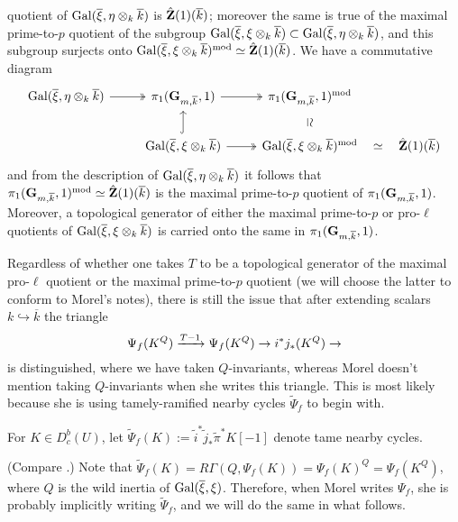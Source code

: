 \documentclass[deligne.tex]{subfiles}
\begin{document}
quotient of $\operatorname{Gal}(\overline\xi,\eta\otimes_k\overline k)$ is
$\hat{\mathbf{Z}}(1)(\overline k)$; moreover the same is true of the maximal
prime-to-$p$ quotient of the subgroup
$\operatorname{Gal}(\overline\xi,\xi\otimes_k\overline k)\subset\operatorname{Gal}(\overline\xi,\eta\otimes_k\overline k)$, and this subgroup surjects onto
$\operatorname{Gal}(\overline\xi,\xi\otimes_k\overline k)^{\text{mod}}\simeq\hat{\mathbf{Z}}(1)(\overline k)$. We have a commutative diagram \cite[2.2.2]{Laumon}
\begin{equation*}\begin{tikzcd}
	\Gal(\overline\xi,\eta\otimes_k\overline k)\arrow[r,twoheadrightarrow]
	&\pi_1(\GG_{m,\overline k},1)\arrow[r,twoheadrightarrow]
	&\pi_1(\GG_{m,\overline k},1)^{\text{mod}}
	\\
	&\Gal(\overline\xi,\xi\otimes_k\overline k)
	\arrow[u,hook]
	\arrow[r,twoheadrightarrow]
	&\Gal(\overline\xi,\xi\otimes_k\overline k)^{\text{mod}}
	\arrow[u, phantom,"\text{\rotatebox{-90}{$\simeq$}}"]\arrow[r,phantom,"\simeq"]
	&\hat\ZZ(1)(\overline k)
\end{tikzcd}\end{equation*}
and from the description of $\operatorname{Gal}(\overline\xi,\eta\otimes_k\overline k)$
it follows that
$\pi_1(\mathbf{G}_{m,\overline k},1)^{\text{mod}}\simeq\hat{\mathbf{Z}}(1)(\overline k)$ is
the maximal prime-to-$p$ quotient of $\pi_1(\mathbf{G}_{m,\overline k},1)$.
Moreover, a topological generator of either the maximal prime-to-$p$ or
pro-$\ell$ quotients of $\operatorname{Gal}(\overline\xi,\xi\otimes_k\overline k)$
is carried onto the same in $\pi_1(\mathbf{G}_{m,\overline k},1)$.

Regardless of whether one takes $T$ to be a topological generator of the
maximal pro-$\ell$ quotient or the maximal prime-to-$p$ quotient (we will
choose the latter to conform to Morel's notes), there is still the issue 
that after extending scalars $k\hookrightarrow\overline k$ the triangle
\begin{equation*}
	\Psi_f(K^Q)\xrightarrow{T-1}\Psi_f(K^Q)\rightarrow i^*j_*(K^Q)\rightarrow
\end{equation*}
is distinguished, where we have taken $Q$-invariants, whereas Morel doesn't
mention taking $Q$-invariants when she writes this triangle.
This is most likely because she is using tamely-ramified nearby cycles
$\tilde\Psi_f$ to begin with.
\begin{definition*}
	For $K\in D_c^b(U)$, let
	$\tilde\Psi_f(K):=\tilde i^*\tilde j_*\tilde\pi^*K[-1]$ denote tame 
	nearby cycles.
\end{definition*}
(Compare \cite[Exp.\,I 2.7]{SGA7}.)
Note that $\tilde\Psi_f(K)=R\Gamma(Q,\Psi_f(K))=\Psi_f(K)^Q=\Psi_f(K^Q)$,
where $Q$ is the wild inertia of $\operatorname{Gal}(\overline\xi,\xi)$.
Therefore, when Morel writes $\Psi_f$, she is probably implicitly writing
$\tilde\Psi_f$, and we will do the same in what follows.
\end{document}
